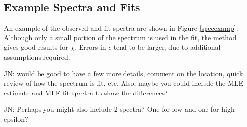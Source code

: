 \documentclass{ametsoc}
\begin{document}
\subsection{Example Spectra and Fits}

An example of the observed and fit spectra are shown in Figure \ref{specexamp}. Although only a small portion of the spectrum is used in the fit, the method gives good results for $\chi$. Errors in $\epsilon$ tend to be larger, due to additional assumptions required.

JN: would be good to have a few more details, comment on the location, quick review of how the spectrum is fit, etc. Also, maybe you could include the MLE estimate and MLE fit spectra to show the differences?

JN: Perhaps you might also include 2 spectra?  One for low and one for high epsilon?

%

\end{document}
